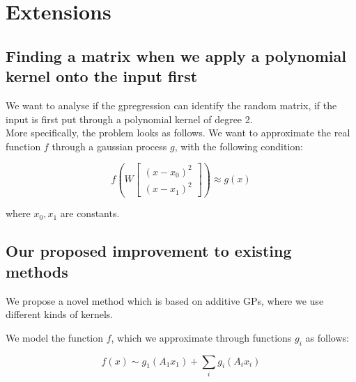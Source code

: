 \chapter{Extensions}

\ifpdf
    \graphicspath{{Chapter3/Figs/Raster/}{Chapter3/Figs/PDF/}{Chapter3/Figs/}}
\else
    \graphicspath{{Chapter3/Figs/Vector/}{Chapter3/Figs/}}
\fi

\section{Finding a matrix when we apply a polynomial kernel onto the input first}
We want to analyse if the gpregression can identify the random matrix, if the input is first put through a polynomial kernel of degree 2. \\

More specifically, the problem looks as follows.
We want to approximate the real function $ f $ through a gaussian process $ g $, with the following condition:

\def\B{
\begin{bmatrix}
    (x - x_0)^2 \\
    (x - x_1)^2
\end{bmatrix}}

\begin{equation}
f \left( W \B \right) \approx g \left( x \right)
\end{equation} 

where $x_0, x_1$ are constants.

\section{Our proposed improvement to existing methods}
We propose a novel method which is based on additive GPs, where we use different kinds of kernels.

We model the function $f$, which we approximate through functions $g_{i}$ as follows:

\begin{equation}
f(x) \sim g_1(A_1 x_1) + \sum_{i} g_i(A_i x_i)
\end{equation}

